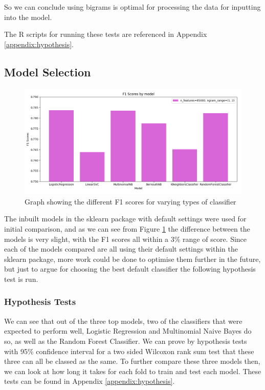So we can conclude using bigrams is optimal for processing the data for inputting into the model.

The R scripts for running these tests are referenced in Appendix \ref{appendix:hypothesis}.

\subsection{Model Selection}


\begin{figure}[h]
\centering
\includegraphics[scale=0.5]{graphs/models.png}
\caption{Graph showing the different F1 scores for varying types of classifier}
\label{model:graph}
\end{figure}

The inbuilt models in the sklearn package with default settings were used for initial comparison, and as we can see from Figure \ref{model:graph} the difference between the models is very slight, with the F1 scores all within a 3\% range of score. Since each of the models compared are all using their default settings within the sklearn package, more work could be done to optimise them further in the future, but just to argue for choosing the best default classifier the following hypothesis test is run.

\subsubsection{Hypothesis Tests}

We can see that out of the three top models, two of the classifiers that were expected to perform well, Logistic Regression and Multinomial Naive Bayes do so, as well as the Random Forest Classifier. We can prove by hypothesis tests with 95\% confidence interval for a two sided Wilcoxon rank sum test that these three can all be classed as the same. To further compare these three models then, we can look at how long it takes for each fold to train and test each model. These tests can be found in Appendix \ref{appendix:hypothesis}.

